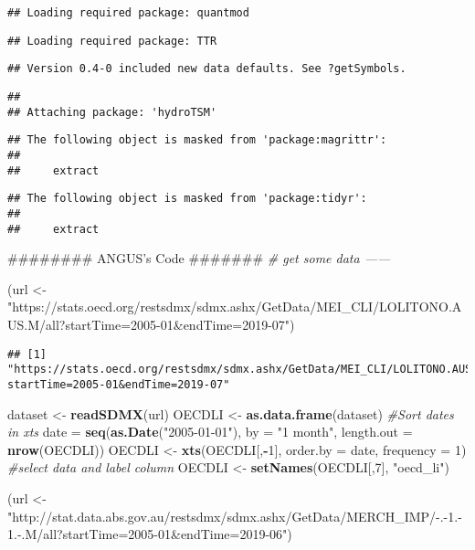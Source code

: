 \documentclass[]{article}
\newenvironment{Shaded}{\begin{snugshade}}{\end{snugshade}}
\newcommand{\KeywordTok}[1]{\textcolor[rgb]{0.13,0.29,0.53}{\textbf{#1}}}
\newcommand{\DataTypeTok}[1]{\textcolor[rgb]{0.13,0.29,0.53}{#1}}
\newcommand{\DecValTok}[1]{\textcolor[rgb]{0.00,0.00,0.81}{#1}}
\newcommand{\StringTok}[1]{\textcolor[rgb]{0.31,0.60,0.02}{#1}}
\newcommand{\CommentTok}[1]{\textcolor[rgb]{0.56,0.35,0.01}{\textit{#1}}}
\newcommand{\OperatorTok}[1]{\textcolor[rgb]{0.81,0.36,0.00}{\textbf{#1}}}
\newcommand{\NormalTok}[1]{#1}
\begin{document}
\begin{verbatim}
## Loading required package: quantmod
\end{verbatim}

\begin{verbatim}
## Loading required package: TTR
\end{verbatim}

\begin{verbatim}
## Version 0.4-0 included new data defaults. See ?getSymbols.
\end{verbatim}

\begin{verbatim}
## 
## Attaching package: 'hydroTSM'
\end{verbatim}

\begin{verbatim}
## The following object is masked from 'package:magrittr':
## 
##     extract
\end{verbatim}

\begin{verbatim}
## The following object is masked from 'package:tidyr':
## 
##     extract
\end{verbatim}

\begin{Shaded}
\begin{Highlighting}[]
\NormalTok{######## ANGUS's Code #######}
\CommentTok{# get some data ------}

\NormalTok{(url <-}\StringTok{ "https://stats.oecd.org/restsdmx/sdmx.ashx/GetData/MEI_CLI/LOLITONO.AUS.M/all?startTime=2005-01&endTime=2019-07"}\NormalTok{)}
\end{Highlighting}
\end{Shaded}

\begin{verbatim}
## [1] "https://stats.oecd.org/restsdmx/sdmx.ashx/GetData/MEI_CLI/LOLITONO.AUS.M/all?startTime=2005-01&endTime=2019-07"
\end{verbatim}

\begin{Shaded}
\begin{Highlighting}[]
\NormalTok{dataset <-}\StringTok{ }\KeywordTok{readSDMX}\NormalTok{(url)}
\NormalTok{OECDLI <-}\StringTok{ }\KeywordTok{as.data.frame}\NormalTok{(dataset)}
\CommentTok{#Sort dates in xts}
\NormalTok{date =}\StringTok{ }\KeywordTok{seq}\NormalTok{(}\KeywordTok{as.Date}\NormalTok{(}\StringTok{"2005-01-01"}\NormalTok{), }\DataTypeTok{by =} \StringTok{"1 month"}\NormalTok{, }\DataTypeTok{length.out =} \KeywordTok{nrow}\NormalTok{(OECDLI))}
\NormalTok{OECDLI <-}\StringTok{ }\KeywordTok{xts}\NormalTok{(OECDLI[,}\OperatorTok{-}\DecValTok{1}\NormalTok{], }\DataTypeTok{order.by =}\NormalTok{ date, }\DataTypeTok{frequency =} \DecValTok{1}\NormalTok{)}
\CommentTok{#select data and label column}
\NormalTok{OECDLI <-}\StringTok{  }\KeywordTok{setNames}\NormalTok{(OECDLI[,}\DecValTok{7}\NormalTok{], }\StringTok{"oecd_li"}\NormalTok{)}

\NormalTok{(url <-}\StringTok{ "http://stat.data.abs.gov.au/restsdmx/sdmx.ashx/GetData/MERCH_IMP/-.-1.-1.-.M/all?startTime=2005-01&endTime=2019-06"}\NormalTok{)}
\end{Highlighting}
\end{Shaded}
\end{document}
